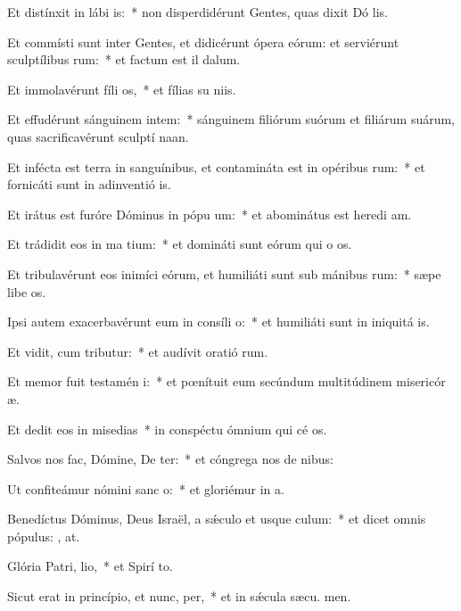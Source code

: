 \item Et distínxit in lábi is:~* non disperdidérunt Gentes, quas dixit Dó lis.
\item Et commísti sunt inter Gentes, et didicérunt ópera eórum: et serviérunt sculptílibus rum:~* et factum est il  dalum.
\item Et immolavérunt fíli os,~* et fílias su niis.
\item Et effudérunt sánguinem intem:~* sánguinem filiórum suórum et filiárum suárum, quas sacrificavérunt sculptí naan.
\item Et infécta est terra in sanguínibus, et contamináta est in opéribus rum:~* et fornicáti sunt in adinventió is.
\item Et irátus est furóre Dóminus in pópu um:~* et abominátus est heredi am.
\item Et trádidit eos in ma tium:~* et domináti sunt eórum qui o os.
\item Et tribulavérunt eos inimíci eórum, et humiliáti sunt sub mánibus rum:~* sæpe libe os.
\item Ipsi autem exacerbavérunt eum in consíli o:~* et humiliáti sunt in iniquitá is.
\item Et vidit, cum tributur:~* et audívit oratió rum.
\item Et memor fuit testamén i:~* et pœnítuit eum secúndum multitúdinem misericór æ.
\item Et dedit eos in misedias~* in conspéctu ómnium qui cé os.
\item Salvos nos fac, Dómine, De ter:~* et cóngrega nos de nibus:
\item Ut confiteámur nómini sanc o:~* et gloriémur in  a.
\item Benedíctus Dóminus, Deus Israël, a sǽculo et usque  culum:~* et dicet omnis pópulus: , at.
\item Glória Patri,  lio,~* et Spirí to.
\item Sicut erat in princípio, et nunc,  per,~* et in sǽcula sæcu. men.
